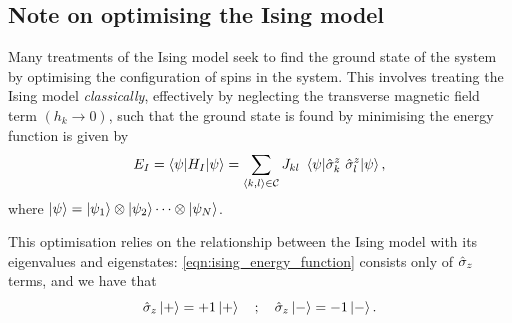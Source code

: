 
\par 
\subsection{Note on optimising the Ising model}\label{sec:ising_optimisation}
Many treatments of the Ising model seek to find the ground state
of the system by optimising the configuration of spins in the system. 
This involves treating the Ising model \emph{classically}, 
effectively by neglecting the transverse magnetic field term $(h_k \rightarrow 0)$,
such that the ground state is found by minimising the energy function is given by
\begin{equation}
\label{eqn:ising_energy_function}
E_I = \braket{\psi | H_I | \psi} = 
\sum_{{ \langle k, l \rangle } \in \mathcal{C}} J_{kl}  \ \braket{ \psi |  \hat{\sigma}_k^z \ \hat{\sigma}_{l}^z | \psi }, 
\end{equation}
where $\ket{\psi} = \ket{\psi_1} \otimes \ket{\psi_2} \dots \otimes \ket{\psi_N}$. 

This optimisation relies on the relationship between the Ising model with its eigenvalues and eigenstates:
\cref{eqn:ising_energy_function} consists only of $\hat{\sigma}_{z}$ terms, and we have that 
\begin{equation}
\sz \ket{+} = +1 \ket{+} \ \ \ ; \ \ \ 
\sz \ket{-} = -1 \ket{-}. 
\end{equation}

